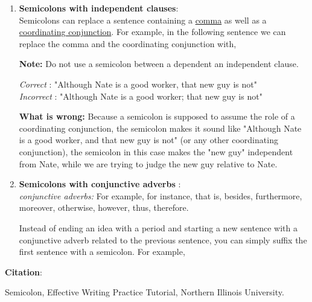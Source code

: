 \documentclass[12pt]{article} %
\begin{document}
\begin{enumerate}
  \item \textbf{Semicolons with independent clauses}:\\
    Semicolons can replace a sentence containing a \underline{comma} as well as a \underline{coordinating conjunction}. 
    For example, in the following sentence we can replace the comma and the coordinating conjunction with, 



    \vspace*{2cm}

    \textbf{Note:} Do not use a semicolon between a dependent an independent clause.

    \textit{Correct} : "Although Nate is a good worker, that new guy is not" \\
    \textit{Incorrect} : "Although Nate is a good worker; that new guy is not" 

    \textbf{What is wrong:} Because a semicolon is supposed to assume the role of a coordinating conjunction, the semicolon makes it
    sound like "Although Nate is a good worker, and that new guy is not" (or any other coordinating conjunction), the semicolon in this case 
    makes the "new guy" independent from Nate, while we are trying to judge the new guy relative to Nate.


  

  \item \textbf{Semicolons with conjunctive adverbs} : \\
    \textit{conjunctive adverbs:} For example, for instance, that is, besides, furthermore, moreover, otherwise, however, thus, therefore.

    Instead of ending an idea with a period and starting a new sentence with a conjunctive adverb related to the previous sentence, you can simply suffix
    the first sentence with a semicolon. For example,



    \vspace*{3cm}


\end{enumerate}

\textbf{Citation}: 

Semicolon, Effective Writing Practice Tutorial, Northern Illinois University.


  
\end{document}
